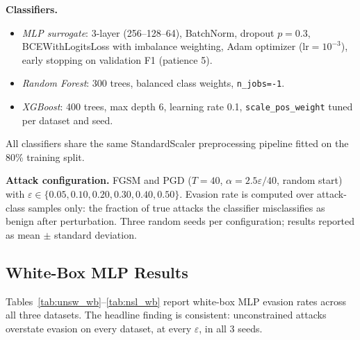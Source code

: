 \documentclass[sigconf,anonymous=true]{acmart}
\begin{document}
\textbf{Classifiers.}
\begin{itemize}
  \item \emph{MLP surrogate}: 3-layer (256--128--64), BatchNorm,
        dropout $p=0.3$, BCEWithLogitsLoss with imbalance weighting,
        Adam optimizer ($\text{lr}=10^{-3}$), early stopping on
        validation F1 (patience 5).
  \item \emph{Random Forest}: 300 trees, balanced class weights,
        \texttt{n\_jobs=-1}.
  \item \emph{XGBoost}: 400 trees, max depth 6, learning rate 0.1,
        \texttt{scale\_pos\_weight} tuned per dataset and seed.
\end{itemize}
All classifiers share the same StandardScaler preprocessing pipeline
fitted on the 80\% training split.

\textbf{Attack configuration.}  FGSM and PGD ($T=40$,
$\alpha = 2.5\varepsilon/40$, random start) with
$\varepsilon \in \{0.05, 0.10, 0.20, 0.30, 0.40, 0.50\}$.
Evasion rate is computed over attack-class samples only: the fraction
of true attacks the classifier misclassifies as benign after
perturbation.  Three random seeds per configuration; results reported
as mean $\pm$ standard deviation.

\subsection{White-Box MLP Results}

Tables~\ref{tab:unsw_wb}--\ref{tab:nsl_wb} report white-box MLP evasion
rates across all three datasets.  The headline finding is consistent:
unconstrained attacks overstate evasion on every dataset, at every
$\varepsilon$, in all 3 seeds.
\end{document}

